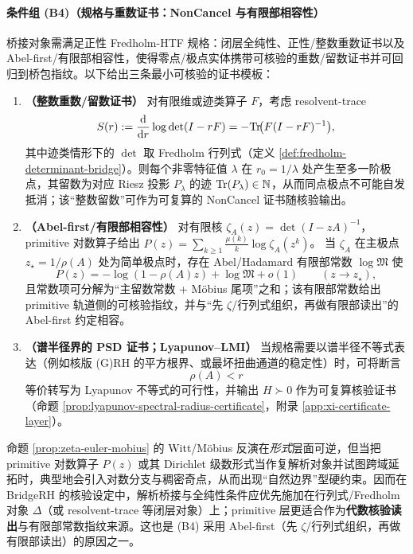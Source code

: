 \paragraph{条件组 (B4)（规格与重数证书：NonCancel 与有限部相容性）}
桥接对象需满足正性 Fredholm-HTF 规格：闭层全纯性、正性/整数重数证书以及 Abel-first/有限部相容性，使得零点/极点实体携带可核验的重数/留数证书并可回归到桥包指纹。以下给出三条最小可核验的证书模板：
\begin{enumerate}
  \item \textbf{（整数重数/留数证书）} 对有限维或迹类算子 $F$，考虑 resolvent-trace
  $$
  S(r):=\frac{\mathrm{d}}{\mathrm{d} r}\log\det(I-rF)=-\mathrm{Tr}\!\bigl(F(I-rF)^{-1}\bigr),
  $$
  其中迹类情形下的 $\det$ 取 Fredholm 行列式（定义 \ref{def:fredholm-determinant-bridge}）。则每个非零特征值 $\lambda$ 在 $r_0=1/\lambda$ 处产生至多一阶极点，其留数为对应 Riesz 投影 $P_\lambda$ 的迹 $\mathrm{Tr}(P_\lambda)\in\mathbb{N}$，从而同点极点不可能自发抵消；该“整数留数”可作为可复算的 NonCancel 证书随核验输出。
  \item \textbf{（Abel-first/有限部相容性）} 对有限核 $\zeta_A(z)=\det(I-zA)^{-1}$，primitive 对数算子给出
  $
  P(z)=\sum_{k\ge 1}\frac{\mu(k)}{k}\log\zeta_A(z^k)
  $。
  当 $\zeta_A$ 在主极点 $z_\star=1/\rho(A)$ 处为简单极点时，存在 Abel/Hadamard 有限部常数 $\log\mathfrak{M}$ 使
  $$
  P(z)=-\log(1-\rho(A)z)+\log\mathfrak{M}+o(1)\qquad (z\to z_\star),
  $$
  且常数项可分解为“主留数常数 + Möbius 尾项”之和；该有限部常数给出 primitive 轨道侧的可核验指纹，并与“先 $\zeta$/行列式组织，再做有限部读出”的 Abel-first 约定相容。
  \item \textbf{（谱半径界的 PSD 证书；Lyapunov--LMI）} 当规格需要以谱半径不等式表达（例如核版 (G)RH 的平方根界、或最坏扭曲通道的稳定性）时，可将断言
  $$
  \rho(A)<r
  $$
  等价转写为 Lyapunov 不等式的可行性，并输出 $H\succ 0$ 作为可复算核验证书（命题 \ref{prop:lyapunov-spectral-radius-certificate}，附录 \ref{app:xi-certificate-layer}）。
\end{enumerate}

\begin{remark}\label{rem:primitive-analytic-nonclosure}
命题 \ref{prop:zeta-euler-mobius} 的 Witt/Möbius 反演在\emph{形式}层面可逆，但当把 primitive 对数算子 $P(z)$ 或其 Dirichlet 级数形式当作复解析对象并试图跨域延拓时，典型地会引入对数分支与稠密奇点，从而出现“自然边界”型硬约束。因而在 BridgeRH 的核验设定中，解析桥接与全纯性条件应优先施加在行列式/Fredholm 对象 $\Delta$（或 resolvent-trace 等闭层对象）上；primitive 层更适合作为\textbf{代数核验读出}与有限部常数指纹来源。这也是 (B4) 采用 Abel-first（先 $\zeta$/行列式组织，再做有限部读出）的原因之一。
\end{remark}

